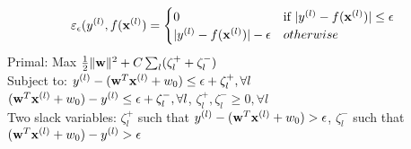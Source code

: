 \begin{description}
         \[\varepsilon_{\epsilon}(y^{(l)}, f(\mathbf{x}^{(l)}) = \begin{cases} 0 & \mbox{if }
                 |y^{(l)} - f(\mathbf{x}^{(l)})|\leq \epsilon \\
             |y^{(l)}-f(\mathbf{x}^{(l)})|-\epsilon & otherwise
     \end{cases} \]
     Primal: Max $\frac{1}{2}\|\mathbf{w}\|^2 + C\sum_l(\zeta^+_l+\zeta^-_l)$\\
     Subject to: $y^{(l)} - (\mathbf{w}^T\mathbf{x}^{(l)}+w_0)\leq \epsilon + \zeta^+_l, \forall l$\\
     $(\mathbf{w}^T\mathbf{x}^{(l)}+w_0)-y^{(l)}\leq \epsilon + \zeta^-_l, \forall l$, $\zeta_l^+,
     \zeta_l^-\geq 0, \forall l$\\
     Two slack variables: $\zeta^+_l$ such that $y^{(l)}  - (\mathbf{w}^T\mathbf{x}^{(l)} + w_0)>
     \epsilon$, $\zeta^-_l$ such that $(\mathbf{w}^T\mathbf{x}^{(l)} + w_0)-y^{(l)}> \epsilon$
\end{description}

